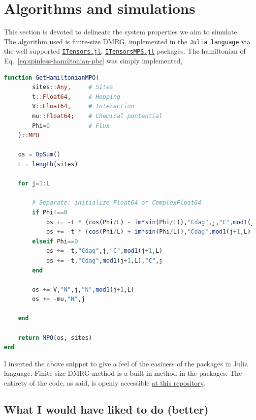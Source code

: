 \clearpage
\section{Algorithms and simulations}

This section is devoted to delineate the system properties we aim to simulate. The algorithm used is finite-size DMRG, implemented in the \href{https://docs.julialang.org/en/}{\texttt{Julia language}} via the well supported \href{https://itensor.github.io/ITensors.jl/stable/index.html}{\texttt{ITensors.jl}}, \href{https://itensor.github.io/ITensorMPS.jl/stable/}{\texttt{ITensorsMPS.jl}} packages. The hamiltonian of Eq.~\eqref{eq:spinless-hamiltonian-pbc} was simply implemented,

\begin{lstlisting}[language=julia]
function GetHamiltonianMPO(
		sites::Any,		# Sites
		t::Float64,		# Hopping
		V::Float64,		# Interaction
		mu::Float64;	# Chemical pontential
		Phi=0			# Flux
	)::MPO

	os = OpSum()
	L = length(sites)
	
	for j=1:L
		
		# Separate: initialize Float64 or ComplexFloat64 
		if Phi!==0
			os += -t * (cos(Phi/L) - im*sin(Phi/L)),"Cdag",j,"C",mod1(j+1,L)
			os += -t * (cos(Phi/L) + im*sin(Phi/L)),"Cdag",mod1(j+1,L),"C",j
		elseif Phi==0
			os += -t,"Cdag",j,"C",mod1(j+1,L)
			os += -t,"Cdag",mod1(j+1,L),"C",j
		end
		
		os += V,"N",j,"N",mod1(j+1,L)
		os += -mu,"N",j
		
	end
	
	return MPO(os, sites)
end
\end{lstlisting}
I inserted the above snippet to give a feel of the easiness of the packages in Julia language. Finite-size DMRG method is a built-in method in the packages. The entirety of the code, as said, is openly accessible \href{https://github.com/nepero27178/FermiHubbardDMRG}{at this repository}.

\subsection{What I would have liked to do (better)}\label{subsec:what-i-would-have-liked-to-do-(better)}

